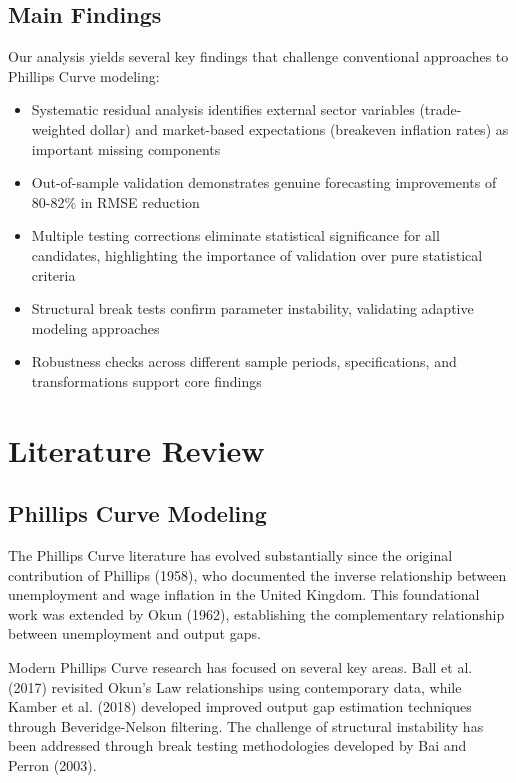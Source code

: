 \documentclass[12pt]{article}
\begin{document}
\subsection{Main Findings}

Our analysis yields several key findings that challenge conventional approaches to Phillips Curve modeling:

\begin{itemize}
\item Systematic residual analysis identifies external sector variables (trade-weighted dollar) and market-based expectations (breakeven inflation rates) as important missing components
\item Out-of-sample validation demonstrates genuine forecasting improvements of 80-82\% in RMSE reduction
\item Multiple testing corrections eliminate statistical significance for all candidates, highlighting the importance of validation over pure statistical criteria  
\item Structural break tests confirm parameter instability, validating adaptive modeling approaches
\item Robustness checks across different sample periods, specifications, and transformations support core findings
\end{itemize}

\section{Literature Review}

\subsection{Phillips Curve Modeling}

The Phillips Curve literature has evolved substantially since the original contribution of Phillips (1958), who documented the inverse relationship between unemployment and wage inflation in the United Kingdom. This foundational work was extended by Okun (1962), establishing the complementary relationship between unemployment and output gaps.

Modern Phillips Curve research has focused on several key areas. Ball et al. (2017) revisited Okun's Law relationships using contemporary data, while Kamber et al. (2018) developed improved output gap estimation techniques through Beveridge-Nelson filtering. The challenge of structural instability has been addressed through break testing methodologies developed by Bai and Perron (2003).
\end{document}
